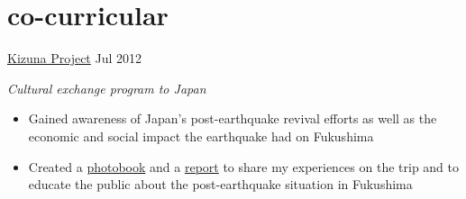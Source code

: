 \documentclass{friggeri-cv} %
\begin{document}
\section{co-curricular}
\entry
{\href{http://www.sg.emb-japan.go.jp/culture_kizuna.htm}{Kizuna Project}}
{Jul 2012}
{\emph{Cultural exchange program to Japan}
\begin{itemize}
\item Gained awareness of Japan's post-earthquake revival efforts as well as the economic and social impact the earthquake had on Fukushima 
\item Created a \href{http://courseware.nus.edu.sg/e-raion/document/KIZUNA/ChongYunLongPhotobook.pdf}{photobook} and a \href{http://courseware.nus.edu.sg/e-raion/document/KIZUNA/ChongYunLongReport.pdf}{report} to share my experiences on the trip and to educate the public about the post-earthquake situation in Fukushima 
\end{itemize}

}
\end{document}
